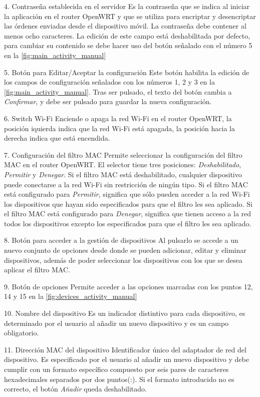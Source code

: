 \documentclass{article}
\begin{document}
    4. Contraseña establecida en el servidor
    Es la contraseña que se indica al iniciar la aplicación en el router OpenWRT y que se utiliza para encriptar y desencriptar las órdenes enviadas desde el dispositivo móvil. La contraseña debe contener al menos ocho caracteres. La edición de este campo está deshabilitada por defecto, para cambiar su contenido se debe hacer uso del botón señalado con el número 5 en la \ref{fig:main_activity_manual}

    5. Botón para Editar/Aceptar la configuración
    Este botón habilita la edición de los campos de configuración señalados con los números 1, 2 y 3 en la \ref{fig:main_activity_manual}. Tras ser pulsado, el texto del botón cambia a \textit{Confirmar}, y debe ser pulsado para guardar la nueva configuración.

    6. Switch Wi-Fi
    Enciende o apaga la red Wi-Fi en el router OpenWRT, la posición iquierda indica que la red Wi-Fi está apagada, la posición hacia la derecha indica que está encendida.

    7. Configuración del filtro MAC
    Permite seleccionar la configuración del filtro MAC en el router OpenWRT. El selector tiene tres posiciones: \textit{Deshabilitado}, \textit{Permitir} y \textit{Denegar}.
    Si el filtro MAC está deshabilitado, cualquier dispositivo puede conectarse a la red Wi-Fi sin restricción de ningún tipo.
    Si el filtro MAC está configurado para \textit{Permitir}, significa que sólo pueden acceder a la red Wi-Fi los dispositivos que hayan sido especificados para que el filtro les sea aplicado.
    Si el filtro MAC está configurado para \textit{Denegar}, significa que tienen acceso a la red todos los dispositivos excepto los especificados para que el filtro les sea aplicado.

    8. Botón para acceder a la gestión de dispositivos
    Al pulsarlo se accede a un nuevo conjunto de opciones desde donde se pueden adicionar, editar y eliminar dispositivos, además de poder seleccionar los dispositivos con los que se desea aplicar el filtro MAC.

    9. Botón de opciones
    Permite acceder a las opciones marcadas con los puntos 12, 14 y 15 en la \ref{fig:devices_activity_manual}

    10. Nombre del dispositivo
    Es un indicador distintivo para cada dispositivo, es determinado por el usuario al añadir un nuevo dispositivo y es un campo obligatorio.

    11. Dirección MAC del dispositivo
    Identificador único del adaptador de red del dispositivo. Es especificado por el usuario al añadir un nuevo dispositivo y debe cumplir con un formato específico compuesto por seis pares de caracteres hexadecimales separados por dos puntos(:). Si el formato introducido no es correcto, el botón \textit{Añadir} queda deshabilitado.
\end{document}
